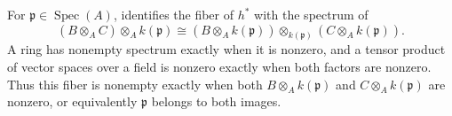 For $\mathfrak p\in\operatorname{Spec}(A)$,  identifies the fiber of $h^*$ with the spectrum of
\[(B\otimes_A C)\otimes_A k(\mathfrak p)\cong(B\otimes_A k(\mathfrak p))\otimes_{k(\mathfrak p)}(C\otimes_A k(\mathfrak p)).\]
A ring has nonempty spectrum exactly when it is nonzero, and a tensor product of vector spaces over a field is nonzero exactly when both factors are nonzero. Thus this fiber is nonempty exactly when both $B\otimes_A k(\mathfrak p)$ and $C\otimes_A k(\mathfrak p)$ are nonzero, or equivalently $\mathfrak p$ belongs to both images.
